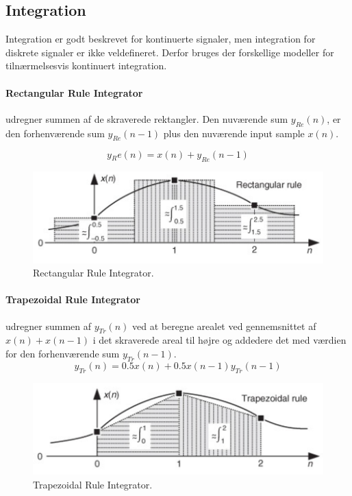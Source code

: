 \documentclass[danish]{article}
\begin{document}
\subsection{Integration}
Integration er godt beskrevet for kontinuerte signaler, men integration for diskrete signaler er ikke veldefineret. Derfor bruges der forskellige modeller for tilnærmelsesvis kontinuert integration.

\paragraph{Rectangular Rule Integrator} udregner summen af de skraverede rektangler. Den nuværende sum $y_{Re}(n)$, er den forhenværende sum $y_{Re}(n-1)$ plus den nuværende input sample $x(n)$.

\begin{equation}
y{_Re}(n) = x(n)+y_{Re}(n-1)
\end{equation}

\begin{figure}[H]
	\centering
	\includegraphics[width=0.6\linewidth]{graphics/rectangular_rule}
	\caption{Rectangular Rule Integrator.}
	\label{fig:rectangular_rule}
\end{figure}


\paragraph{Trapezoidal Rule Integrator} udregner summen af  $y_{Tr}(n)$ ved at beregne arealet ved gennemsnittet af $x(n) + x(n-1)$ i det skraverede areal til højre og addedere det med værdien for den forhenværende sum $y_{Tr}(n-1)$.
\begin{equation}
y_{Tr}(n) = 0.5 x(n)+ 0.5 x(n-1) y_{Tr}(n-1)
\end{equation}

\begin{figure}[H]
	\centering
	\includegraphics[width=0.6\linewidth]{graphics/trapezoidal_rule}
	\caption{Trapezoidal Rule Integrator.}
	\label{fig:trapezoidal_rule}
\end{figure}
\end{document}
